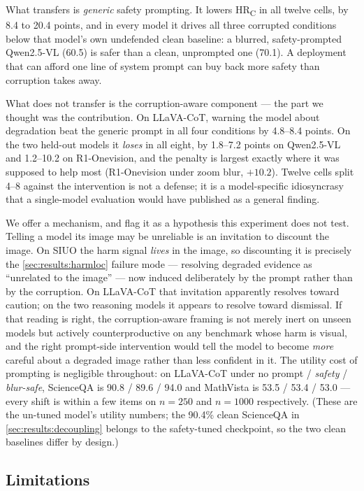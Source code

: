 What transfers is \emph{generic} safety prompting. It lowers HR\textsubscript{C} in all twelve cells, by 8.4 to 20.4 points, and in every model it drives all three corrupted conditions below that model's own undefended clean baseline: a blurred, safety-prompted Qwen2.5-VL (60.5) is safer than a clean, unprompted one (70.1). A deployment that can afford one line of system prompt can buy back more safety than corruption takes away.

What does not transfer is the corruption-aware component --- the part we thought was the contribution. On LLaVA-CoT, warning the model about degradation beat the generic prompt in all four conditions by 4.8--8.4 points. On the two held-out models it \emph{loses} in all eight, by 1.8--7.2 points on Qwen2.5-VL and 1.2--10.2 on R1-Onevision, and the penalty is largest exactly where it was supposed to help most (R1-Onevision under zoom blur, $+10.2$). Twelve cells split 4--8 against the intervention is not a defense; it is a model-specific idiosyncrasy that a single-model evaluation would have published as a general finding.

We offer a mechanism, and flag it as a hypothesis this experiment does not test. Telling a model its image may be unreliable is an invitation to discount the image. On SIUO the harm signal \emph{lives} in the image, so discounting it is precisely the \cref{sec:results:harmloc} failure mode --- resolving degraded evidence as ``unrelated to the image'' --- now induced deliberately by the prompt rather than by the corruption. On LLaVA-CoT that invitation apparently resolves toward caution; on the two reasoning models it appears to resolve toward dismissal. If that reading is right, the corruption-aware framing is not merely inert on unseen models but actively counterproductive on any benchmark whose harm is visual, and the right prompt-side intervention would tell the model to become \emph{more} careful about a degraded image rather than less confident in it. The utility cost of prompting is negligible throughout: on LLaVA-CoT under no prompt / \emph{safety} / \emph{blur-safe}, ScienceQA is 90.8 / 89.6 / 94.0 and MathVista is 53.5 / 53.4 / 53.0 --- every shift is within a few items on $n{=}250$ and $n{=}1000$ respectively. (These are the un-tuned model's utility numbers; the 90.4\% clean ScienceQA in \cref{sec:results:decoupling} belongs to the safety-tuned checkpoint, so the two clean baselines differ by design.)

\subsection{Limitations}
\label{sec:defenses:limits}


